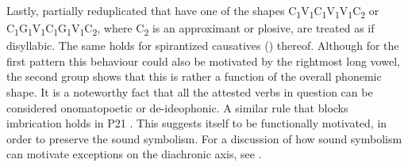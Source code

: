 Lastly, partially reduplicated that have one of the shapes \mbox{C\textsubscript{1}V\textsubscript{1}C\textsubscript{1}V\textsubscript{1}V\textsubscript{1}C\textsubscript{2}} or \mbox{C\textsubscript{1}G\textsubscript{1}V\textsubscript{1}C\textsubscript{1}G\textsubscript{1}V\textsubscript{1}C\textsubscript{2}}, where C\textsubscript{2} is an approximant or plosive, are treated as if disyllabic. The same holds for spirantized causatives () thereof. Although for the first pattern this behaviour could also be motivated by the rightmost long vowel, the second group shows that this is rather a function of the overall phonemic shape. It is a noteworthy fact that all the attested verbs in question can be considered onomatopoetic or de-ideophonic. A similar rule that blocks imbrication holds in  P21 \citep[112, 120]{BergerP1938}. This suggests itself to be functionally motivated, in order to preserve the sound symbolism. For a discussion of how sound symbolism can motivate exceptions on the diachronic axis, see \citet[55f]{DimmendaalG2011}.
